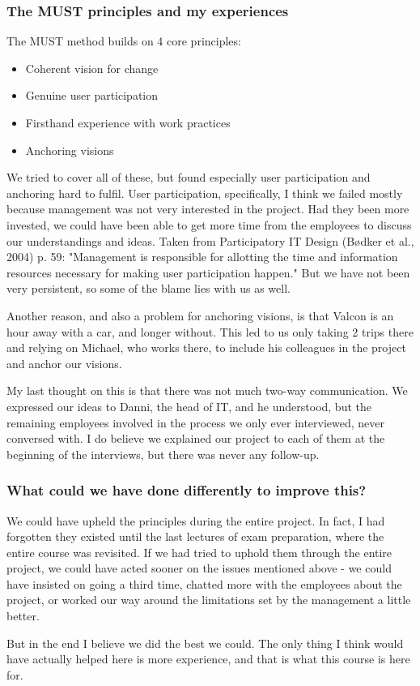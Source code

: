 \subsubsection{The MUST principles and my experiences}
The MUST method builds on 4 core principles:
\begin{itemize}
\item Coherent vision for change
\item Genuine user participation
\item Firsthand experience with work practices
\item Anchoring visions
\end{itemize}
We tried to cover all of these, but found especially user participation and anchoring hard to fulfil.
User participation, specifically, I think we failed mostly because management was not very interested in the project.
Had they been more invested, we could have been able to get more time from the employees to discuss our understandings and ideas.
Taken from Participatory IT Design (Bødker et al., 2004) p. 59: "Management is responsible for allotting the time and information resources necessary for making user participation happen."
But we have not been very persistent, so some of the blame lies with us as well.

Another reason, and also a problem for anchoring visions, is that Valcon is an hour away with a car, and longer without.
This led to us only taking 2 trips there and relying on Michael, who works there, to include his colleagues in the project and anchor our visions.

My last thought on this is that there was not much two-way communication.
We expressed our ideas to Danni, the head of IT, and he understood, but the remaining employees involved in the process we only ever interviewed, never conversed with.
I do believe we explained our project to each of them at the beginning of the interviews, but there was never any follow-up.

\subsubsection{What could we have done differently to improve this?}
We could have upheld the principles during the entire project.
In fact, I had forgotten they existed until the last lectures of exam preparation, where the entire course was revisited.
If we had tried to uphold them through the entire project, we could have acted sooner on the issues mentioned above - we could have insisted on going a third time, chatted more with the employees about the project, or worked our way around the limitations set by the management a little better.

But in the end I believe we did the best we could.
The only thing I think would have actually helped here is more experience, and that is what this course is here for.
